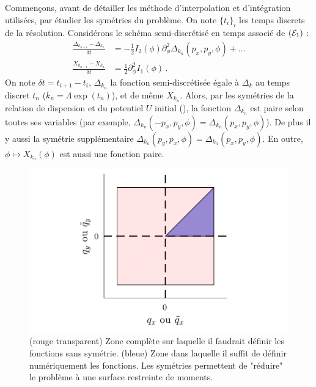 \documentclass[10.5pt]{article}
\begin{document}
\begin{multicols}{2}
\label{sec:Sym}

Commençons, avant de détailler les méthode d'interpolation et d'intégration utilisées, par étudier les symétries du problème. On note $\{t_i\}_i$ les temps discrets de la résolution. Considérons le schéma semi-discrétisé en temps associé de $(\mathcal{E}_1)$  :
\begin{equation}
	\begin{split}
	\frac{\Delta_{k_{n+1}} - \Delta_{k_{n}}}{\delta t}	& =  - \frac{1}{2} I_2(\phi) \partial_{\phi}^2 \Delta_{k_n}(p_x, p_y, \phi)  +  ... \\
	\frac{X_{k_{n+1}} - X_{k_{n}}}{\delta t} & = \frac{1}{2} \partial_{\phi}^2 I_1(\phi) \, .
	\end{split}
\end{equation}
On note $\delta t = t_{i+1} - t_i$, $\Delta_{k_n}$ la fonction semi-discrétisée égale à $\Delta_k$ au temps discret $t_n$ ($k_n = \Lambda\exp(t_n)$), et de même $X_{k_n}$. Alors, par les symétries de la relation de dispersion et du potentiel $U$ initial (), la fonction $\Delta_{k_n}$ est paire selon toutes ses variables (par exemple, $\Delta_{k_n}(-p_x, p_y, \phi) = \Delta_{k_n}(p_x, p_y, \phi)$). De plus il y aussi la symétrie supplémentaire $\Delta_{k_n}(p_y, p_x, \phi) = \Delta_{k_n} (p_x, p_y, \phi)$. En outre, $\phi \mapsto X_{k_n}(\phi)$ est aussi une fonction paire. 

\begin{figure}[H]
\begin{center}
	\includegraphics[width=0.95\columnwidth]{SurfUtile.pdf}
\end{center}
\vspace*{-22pt}
\caption{(rouge transparent) Zone complète sur laquelle il faudrait définir les fonctions sans symétrie. (bleue) Zone dans laquelle il suffit de définir numériquement les fonctions. Les symétries permettent de "réduire" le problème à une surface restreinte de moments.}
\label{fig:SurfUtile}
\end{figure}



\end{multicols}
\end{document}
